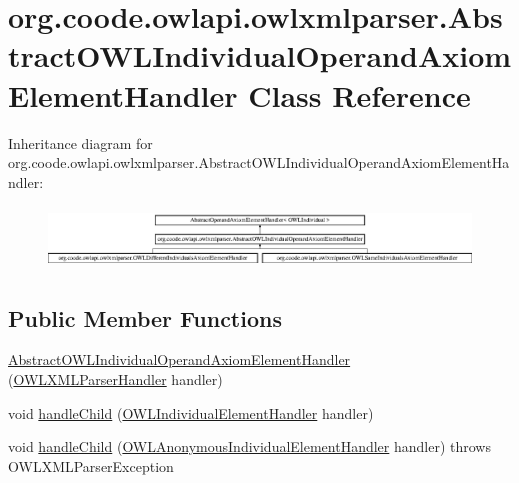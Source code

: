 \hypertarget{classorg_1_1coode_1_1owlapi_1_1owlxmlparser_1_1_abstract_o_w_l_individual_operand_axiom_element_handler}{\section{org.\-coode.\-owlapi.\-owlxmlparser.\-Abstract\-O\-W\-L\-Individual\-Operand\-Axiom\-Element\-Handler Class Reference}
\label{classorg_1_1coode_1_1owlapi_1_1owlxmlparser_1_1_abstract_o_w_l_individual_operand_axiom_element_handler}
}
Inheritance diagram for org.\-coode.\-owlapi.\-owlxmlparser.\-Abstract\-O\-W\-L\-Individual\-Operand\-Axiom\-Element\-Handler\-:\begin{figure}[H]
\begin{center}
\leavevmode
\includegraphics[height=1.673307cm]{classorg_1_1coode_1_1owlapi_1_1owlxmlparser_1_1_abstract_o_w_l_individual_operand_axiom_element_handler}
\end{center}
\end{figure}
\subsection*{Public Member Functions}
\begin{DoxyCompactItemize}
\item 
\hyperlink{classorg_1_1coode_1_1owlapi_1_1owlxmlparser_1_1_abstract_o_w_l_individual_operand_axiom_element_handler_a0fe904030a83e47af3c70c04311d3c45}{Abstract\-O\-W\-L\-Individual\-Operand\-Axiom\-Element\-Handler} (\hyperlink{classorg_1_1coode_1_1owlapi_1_1owlxmlparser_1_1_o_w_l_x_m_l_parser_handler}{O\-W\-L\-X\-M\-L\-Parser\-Handler} handler)
\item 
void \hyperlink{classorg_1_1coode_1_1owlapi_1_1owlxmlparser_1_1_abstract_o_w_l_individual_operand_axiom_element_handler_a903848da20df793b3f4f5d84989b222e}{handle\-Child} (\hyperlink{classorg_1_1coode_1_1owlapi_1_1owlxmlparser_1_1_o_w_l_individual_element_handler}{O\-W\-L\-Individual\-Element\-Handler} handler)
\item 
void \hyperlink{classorg_1_1coode_1_1owlapi_1_1owlxmlparser_1_1_abstract_o_w_l_individual_operand_axiom_element_handler_ae173f8e7bbbcefcbbbd317b24a4ee097}{handle\-Child} (\hyperlink{classorg_1_1coode_1_1owlapi_1_1owlxmlparser_1_1_o_w_l_anonymous_individual_element_handler}{O\-W\-L\-Anonymous\-Individual\-Element\-Handler} handler)  throws O\-W\-L\-X\-M\-L\-Parser\-Exception 
\end{DoxyCompactItemize}


